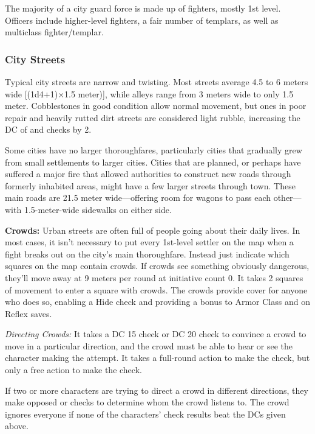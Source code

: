 The majority of a city guard force is made up of fighters, mostly 1st level. Officers include higher-level fighters, a fair number of templars, as well as multiclass fighter/templar.

\subsubsection{City Streets}
Typical city streets are narrow and twisting. Most streets average 4.5 to 6 meters wide [(1d4+1)$\times$1.5 meter)], while alleys range from 3 meters wide to only 1.5 meter. Cobblestones in good condition allow normal movement, but ones in poor repair and heavily rutted dirt streets are considered light rubble, increasing the DC of  and  checks by 2.

Some cities have no larger thoroughfares, particularly cities that gradually grew from small settlements to larger cities. Cities that are planned, or perhaps have suffered a major fire that allowed authorities to construct new roads through formerly inhabited areas, might have a few larger streets through town. These main roads are 21.5 meter wide---offering room for wagons to pass each other---with 1.5-meter-wide sidewalks on either side.

\textbf{Crowds:} Urban streets are often full of people going about their daily lives. In most cases, it isn't necessary to put every 1st-level settler on the map when a fight breaks out on the city's main thoroughfare. Instead just indicate which squares on the map contain crowds. If crowds see something obviously dangerous, they'll move away at 9 meters per round at initiative count 0. It takes 2 squares of movement to enter a square with crowds. The crowds provide cover for anyone who does so, enabling a Hide check and providing a bonus to Armor Class and on Reflex saves.

\textit{Directing Crowds:} It takes a DC 15  check or DC 20  check to convince a crowd to move in a particular direction, and the crowd must be able to hear or see the character making the attempt. It takes a full-round action to make the  check, but only a free action to make the  check.

If two or more characters are trying to direct a crowd in different directions, they make opposed  or  checks to determine whom the crowd listens to. The crowd ignores everyone if none of the characters' check results beat the DCs given above.

